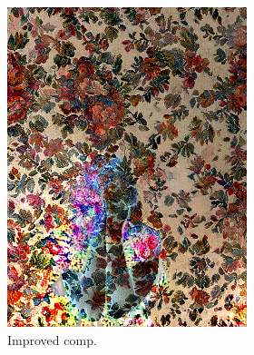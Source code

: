 \begin{figure}[]
\begin{subfigure}{\textwidth}
        \begin{subfigure}{0.24\textwidth}
            \centering
            \includegraphics[width=\textwidth]{images/04-experiment02/human/flowers/improved_im.jpg}
            \caption*{Improved comp.}
        \end{subfigure}
        \hfill
        \begin{subfigure}{0.24\textwidth}
            \centering

\end{subfigure}
\end{subfigure}
\end{figure}
